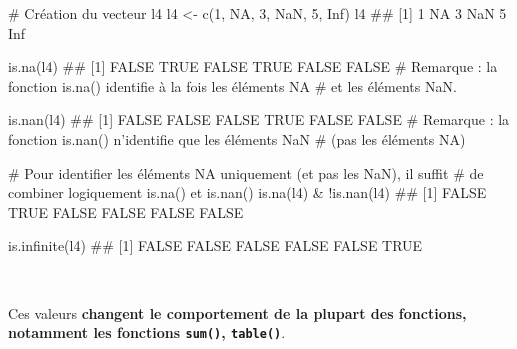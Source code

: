 \documentclass[12pt,twosided, notitlepage]{book}
\newenvironment{Shaded}{}{}
\newcommand{\KeywordTok}[1]{\textcolor[rgb]{0.00,0.00,1.00}{{#1}}}
\newcommand{\DecValTok}[1]{{#1}}
\newcommand{\StringTok}[1]{\textcolor[rgb]{0.00,0.50,0.50}{{#1}}}
\newcommand{\CommentTok}[1]{\textcolor[rgb]{0.00,0.50,0.00}{{#1}}}
\newcommand{\OtherTok}[1]{\textcolor[rgb]{1.00,0.25,0.00}{{#1}}}
\newcommand{\NormalTok}[1]{{#1}}
\renewenvironment{Shaded}{\begin{snugshade}}{\end{snugshade}}
\begin{document}
\begin{Shaded}
\begin{Highlighting}[]
\CommentTok{# Création du vecteur l4}
\NormalTok{l4 <-}\StringTok{ }\KeywordTok{c}\NormalTok{(}\DecValTok{1}\NormalTok{, }\OtherTok{NA}\NormalTok{, }\DecValTok{3}\NormalTok{, }\OtherTok{NaN}\NormalTok{, }\DecValTok{5}\NormalTok{, }\OtherTok{Inf}\NormalTok{)}
\NormalTok{l4}
  \NormalTok{## [1]   1  NA   3 NaN   5 Inf}

\KeywordTok{is.na}\NormalTok{(l4)}
  \NormalTok{## [1] FALSE  TRUE FALSE  TRUE FALSE FALSE}
\CommentTok{# Remarque : la fonction is.na() identifie à la fois les éléments NA}
\CommentTok{# et les éléments NaN. }

\KeywordTok{is.nan}\NormalTok{(l4)}
  \NormalTok{## [1] FALSE FALSE FALSE  TRUE FALSE FALSE}
\CommentTok{# Remarque : la fonction is.nan() n'identifie que les éléments NaN}
\CommentTok{# (pas les éléments NA)}

\CommentTok{# Pour identifier les éléments NA uniquement (et pas les NaN), il suffit}
\CommentTok{# de combiner logiquement is.na() et is.nan()}
\KeywordTok{is.na}\NormalTok{(l4) &}\StringTok{ }\NormalTok{!}\KeywordTok{is.nan}\NormalTok{(l4)}
  \NormalTok{## [1] FALSE  TRUE FALSE FALSE FALSE FALSE}

\KeywordTok{is.infinite}\NormalTok{(l4)}
  \NormalTok{## [1] FALSE FALSE FALSE FALSE FALSE  TRUE}
\end{Highlighting}
\end{Shaded}

~

Ces valeurs \textbf{changent le comportement de la plupart des
fonctions, notamment les fonctions \texttt{sum()},
\texttt{table()}}.
\end{document}

